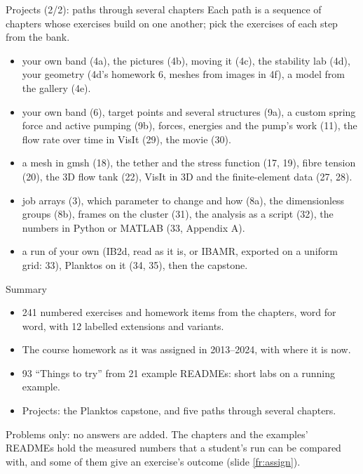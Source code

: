 \documentclass[aspectratio=169,11pt]{beamer}
\begin{document}
\begin{frame}{Projects (2/2): paths through several chapters}
\label{fr:proj2}
\footnotesize
Each path is a sequence of chapters whose exercises build on one another; pick the exercises of each step from the bank.
\begin{itemize}\setlength{\itemsep}{3pt}
  \item {} your own band (4a), the pictures (4b), moving it (4c), the stability lab (4d), your geometry (4d's homework 6, meshes from images in 4f), a model from the gallery (4e).
  \item {} your own band (6), target points and several structures (9a), a custom spring force and active pumping (9b), forces, energies and the pump's work (11), the flow rate over time in VisIt (29), the movie (30).
  \item {} a mesh in gmsh (18), the tether and the stress function (17, 19), fibre tension (20), the 3D flow tank (22), VisIt in 3D and the finite-element data (27, 28).
  \item {} job arrays (3), which parameter to change and how (8a), the dimensionless groups (8b), frames on the cluster (31), the analysis as a script (32), the numbers in Python or MATLAB (33, Appendix A).
  \item {} a run of your own (IB2d, read as it is, or IBAMR, exported on a uniform grid: 33), Planktos on it (34, 35), then the capstone.
\end{itemize}
\end{frame}

\begin{frame}{Summary}
\label{fr:summary}
\begin{itemize}
  \item 241 numbered exercises and homework items from the chapters, word for word, with 12 labelled extensions and variants.
  \item The course homework as it was assigned in 2013--2024, with where it is now.
  \item 93 ``Things to try'' from 21 example READMEs: short labs on a running example.
  \item Projects: the Planktos capstone, and five paths through several chapters.
\end{itemize}
\begin{punchbox}
\small Problems only: no answers are added. The chapters and the examples' READMEs hold the measured numbers that a student's run can be compared with, and some of them give an exercise's outcome (slide \ref{fr:assign}).
\end{punchbox}
\end{frame}
\end{document}
